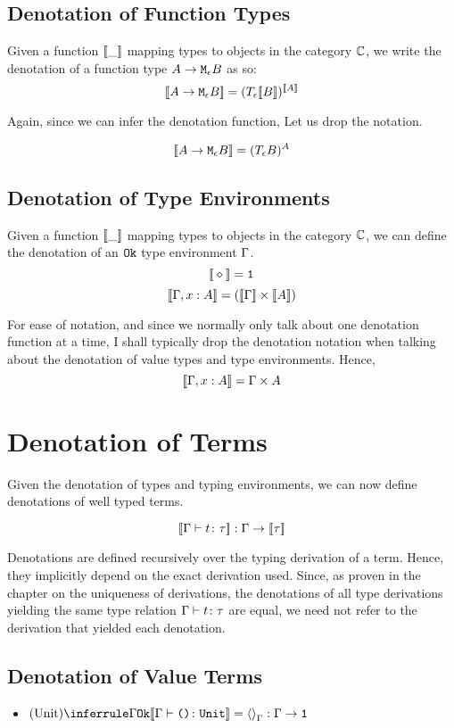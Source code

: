 {    \subsection{Denotation of Function Types}
    Given a function ${\bf [\![}\_{\bf ]\!]}$ mapping types to objects in the category $\mathbb{C}$, we write the denotation of a function type $A \rightarrow \texttt{M}_{\epsilon}{B}$ as so:
    $${\bf [\![}A \rightarrow \texttt{M}_{\epsilon}{B}{\bf ]\!]} = (T_{\epsilon}{{\bf [\![}B{\bf ]\!]}})^{{\bf [\![}A{\bf ]\!]}}$$
    
    Again, since we can infer the denotation function, Let us drop the notation.
    
    $${\bf [\![}A \rightarrow \texttt{M}_{\epsilon}{B}{\bf ]\!]} = (T_{\epsilon}{B})^A$$
    
    \subsection{Denotation of Type Environments}
    Given a function ${\bf [\![}\_{\bf ]\!]}$ mapping types to objects in the category $\mathbb{C}$, we can define the denotation of an $\texttt{Ok}$ type environment $\Gamma$.
    $${\bf [\![}\diamond{\bf ]\!]} = \texttt{1}$$
    $${\bf [\![}\Gamma, x: A{\bf ]\!]} = ({\bf [\![}\Gamma{\bf ]\!]}\times{\bf [\![}A{\bf ]\!]}) $$
    
    For ease of notation, and since we normally only talk about one denotation function at a time, I shall typically drop the denotation notation when talking about the denotation of value types and type environments. Hence, $${\bf [\![}\Gamma, x: A{\bf ]\!]} = \Gamma \times A$$
    
    
    \section{Denotation of Terms}
    Given the denotation of types and typing environments, we can now define denotations of well typed terms.
    
    $${\bf [\![}\Gamma \vdash t \colon \tau{\bf ]\!]}: \Gamma \rightarrow {\bf [\![}\tau{\bf ]\!]}$$
    
    Denotations are defined recursively over the typing derivation of a term. Hence, they implicitly depend on the exact derivation used. Since, as proven in the chapter on the uniqueness of derivations, the denotations of all type derivations yielding the same type relation $\Gamma \vdash t \colon \tau$ are equal, we need not refer to the derivation that yielded each denotation.
    
    \subsection{Denotation of Value Terms}
    \begin{itemize}
        \item $\ntreeruleI{Unit}{\ok{\G}}{\deno{\typerelation{\G}{\u}{\U}} = \term{\G} : \G \rightarrow \1}$
            

\end{itemize}}
